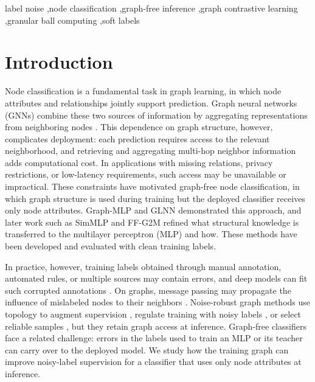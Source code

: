 \documentclass[a4paper,fleqn]{cas-sc}
\theoremstyle{definition}
\theoremstyle{plain}
\begin{document}
\begin{keywords}
label noise \sep node classification \sep graph-free inference \sep graph contrastive learning \sep granular ball computing \sep soft labels
\end{keywords}
\maketitle
\section{Introduction}\label{sec:1}

Node classification is a fundamental task in graph learning, in which node attributes and relationships jointly support prediction. Graph neural networks (GNNs) combine these two sources of information by aggregating representations from neighboring nodes \cite{ref1}. This dependence on graph structure, however, complicates deployment: each prediction requires access to the relevant neighborhood, and retrieving and aggregating multi-hop neighbor information adds computational cost. In applications with missing relations, privacy restrictions, or low-latency requirements, such access may be unavailable or impractical. These constraints have motivated graph-free node classification, in which graph structure is used during training but the deployed classifier receives only node attributes. Graph-MLP \cite{ref3} and GLNN \cite{ref4} demonstrated this approach, and later work such as SimMLP \cite{ref41} and FF-G2M \cite{ref45} refined what structural knowledge is transferred to the multilayer perceptron (MLP) and how. These methods have been developed and evaluated with clean training labels.

In practice, however, training labels obtained through manual annotation, automated rules, or multiple sources may contain errors, and deep models can fit such corrupted annotations \cite{ref24}. On graphs, message passing may propagate the influence of mislabeled nodes to their neighbors \cite{ref6}. Noise-robust graph methods use topology to augment supervision \cite{ref7}, regulate training with noisy labels \cite{ref8}, or select reliable samples \cite{ref9}, but they retain graph access at inference. Graph-free classifiers face a related challenge: errors in the labels used to train an MLP or its teacher can carry over to the deployed model. We study how the training graph can improve noisy-label supervision for a classifier that uses only node attributes at inference.
\end{document}
